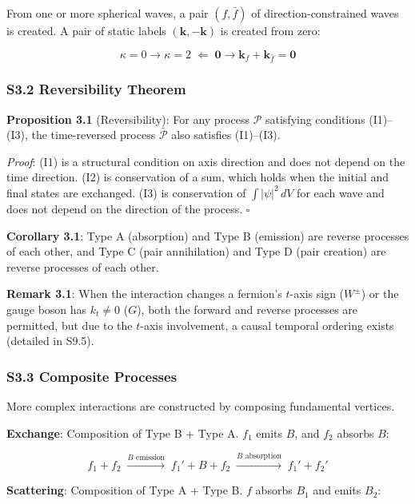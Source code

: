 \documentclass[
  a4paper,11pt]{article}
\theoremstyle{definition}
\theoremstyle{remark}
\begin{document}
From one or more spherical waves, a pair \((f, \bar{f})\) of
direction-constrained waves is created. A pair of static labels
\((\mathbf{k}, -\mathbf{k})\) is created from zero:

\[\kappa = 0 \to \kappa = 2 \;\Longleftarrow\; \mathbf{0} \to \mathbf{k}_f + \mathbf{k}_{\bar{f}} = \mathbf{0}\]

\subsubsection{S3.2 Reversibility
Theorem}\label{s3.2-reversibility-theorem}

\textbf{Proposition 3.1} (Reversibility): For any process
\(\mathcal{P}\) satisfying conditions (I1)--(I3), the time-reversed
process \(\bar{\mathcal{P}}\) also satisfies (I1)--(I3).

\emph{Proof}: (I1) is a structural condition on axis direction and does
not depend on the time direction. (I2) is conservation of a sum, which
holds when the initial and final states are exchanged. (I3) is
conservation of \(\int |\psi|^2 \, dV\) for each wave and does not
depend on the direction of the process. \(\square\)

\textbf{Corollary 3.1}: Type A (absorption) and Type B (emission) are
reverse processes of each other, and Type C (pair annihilation) and Type
D (pair creation) are reverse processes of each other.

\textbf{Remark 3.1}: When the interaction changes a fermion's \(t\)-axis
sign (\(W^{\pm}\)) or the gauge boson has \(k_t \neq 0\) (\(G\)), both
the forward and reverse processes are permitted, but due to the
\(t\)-axis involvement, a causal temporal ordering exists (detailed in
S9.5).

\subsubsection{S3.3 Composite Processes}\label{s3.3-composite-processes}

More complex interactions are constructed by composing fundamental
vertices.

\textbf{Exchange}: Composition of Type B + Type A. \(f_1\) emits \(B\),
and \(f_2\) absorbs \(B\):

\[f_1 + f_2 \;\xrightarrow{B\text{ emission}}\; f_1' + B + f_2 \;\xrightarrow{B\text{ absorption}}\; f_1' + f_2'\]

\textbf{Scattering}: Composition of Type A + Type B. \(f\) absorbs
\(B_1\) and emits \(B_2\):
\end{document}
